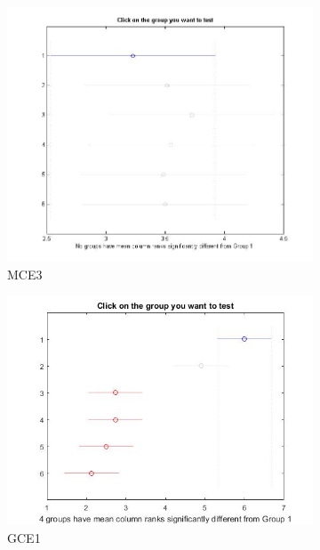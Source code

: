 \begin{figure}
\begin{subfigure}[b]{0.49\linewidth}
		\includegraphics[width=\linewidth]{Figures/Bonferroni_HNMED_VS_ED_P3}
		\caption{MCE3} \label{fig:Bon_M3} 
	\end{subfigure}
	\begin{subfigure}[b]{0.49\linewidth}
		\includegraphics[width=\linewidth]{Figures/Bonferroni_HNMED_VS_ED_P4}
		\caption{GCE1} \label{fig:Bon_G1} 
	\end{subfigure}
	\begin{subfigure}[b]{0.49\linewidth}

\end{subfigure}
\end{figure}
